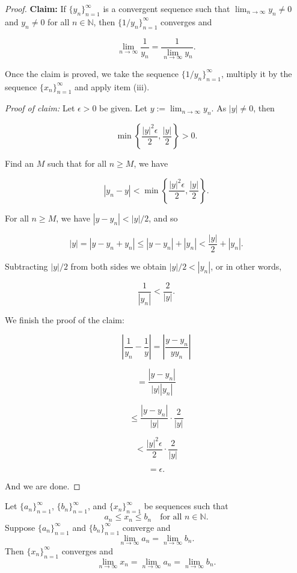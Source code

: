 \documentclass[../main.tex]{subfiles}
\begin{document}
\begin{proof}
\textbf{Claim:} If $\{y_n\}_{n=1}^{\infty}$ is a convergent sequence such that $\lim_{n \to \infty} y_n \neq 0$ and $y_n \neq 0$ for all $n \in \mathbb{N}$, then $\{1/y_n\}_{n=1}^{\infty}$ converges and

\[
\lim_{n \to \infty} \frac{1}{y_n} = \frac{1}{\lim_{n \to \infty} y_n}.
\]

Once the claim is proved, we take the sequence $\{1/y_n\}_{n=1}^{\infty}$, multiply it by the sequence $\{x_n\}_{n=1}^{\infty}$ and apply item (iii).

\textit{Proof of claim:} Let $\epsilon > 0$ be given. Let $y := \lim_{n \to \infty} y_n$. As $|y| \neq 0$, then

\[
\min \left\{ \frac{|y|^2 \epsilon}{2}, \frac{|y|}{2} \right\} > 0.
\]

Find an $M$ such that for all $n \geq M$, we have

\[
|y_n - y| < \min \left\{ \frac{|y|^2 \epsilon}{2}, \frac{|y|}{2} \right\}.
\]

For all $n \geq M$, we have $|y - y_n| < |y|/2$, and so

\[
|y| = |y - y_n + y_n| \leq |y - y_n| + |y_n| < \frac{|y|}{2} + |y_n|.
\]

Subtracting $|y|/2$ from both sides we obtain $|y|/2 < |y_n|$, or in other words,

\[
\frac{1}{|y_n|} < \frac{2}{|y|}.
\]

We finish the proof of the claim:

\[
\left| \frac{1}{y_n} - \frac{1}{y} \right| = \left| \frac{y - y_n}{y y_n} \right|
\]

\[
= \frac{|y - y_n|}{|y| |y_n|}
\]

\[
\leq \frac{|y - y_n|}{|y|} \cdot \frac{2}{|y|}
\]

\[
< \frac{|y|^2 \epsilon}{2} \cdot \frac{2}{|y|}
\]

\[
= \epsilon.
\]

And we are done.
    \end{proof}
    
    
    
    
    
    
    
    
    
    
    
    
    
    
    
    
    
    
    
    
    \begin{lemma} \label{lem:squeeze}
    Let \( \{a_n\}_{n=1}^{\infty} \), \( \{b_n\}_{n=1}^{\infty} \), and \( \{x_n\}_{n=1}^{\infty} \) be sequences such that
    \[
    a_n \leq x_n \leq b_n \quad \text{for all } n \in \mathbb{N}.
    \]
    Suppose \( \{a_n\}_{n=1}^{\infty} \) and \( \{b_n\}_{n=1}^{\infty} \) converge and
    \[
    \lim_{n\to\infty} a_n = \lim_{n\to\infty} b_n.
    \]
    Then \( \{x_n\}_{n=1}^{\infty} \) converges and
    \[
    \lim_{n\to\infty} x_n = \lim_{n\to\infty} a_n = \lim_{n\to\infty} b_n.
    \]
    \end{lemma}
    
\end{document}

